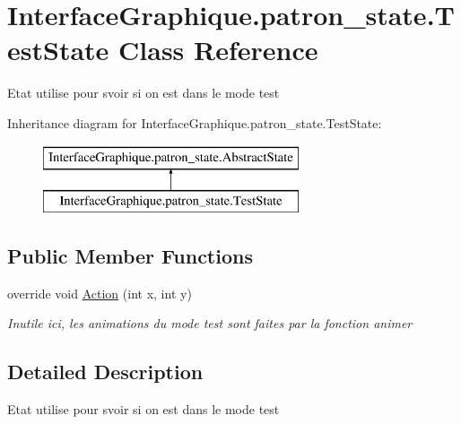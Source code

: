 \hypertarget{class_interface_graphique_1_1patron__state_1_1_test_state}{\section{Interface\-Graphique.\-patron\-\_\-state.\-Test\-State Class Reference}
\label{class_interface_graphique_1_1patron__state_1_1_test_state}
}


Etat utilise pour svoir si on est dans le mode test  


Inheritance diagram for Interface\-Graphique.\-patron\-\_\-state.\-Test\-State\-:\begin{figure}[H]
\begin{center}
\leavevmode
\includegraphics[height=2.000000cm]{class_interface_graphique_1_1patron__state_1_1_test_state}
\end{center}
\end{figure}
\subsection*{Public Member Functions}
\begin{DoxyCompactItemize}
\item 
override void \hyperlink{class_interface_graphique_1_1patron__state_1_1_test_state_ab7aa954cce22801d52158f3d70cbdcac}{Action} (int x, int y)
\begin{DoxyCompactList}\small\item\em Inutile ici, les animations du mode test sont faites par la fonction animer \end{DoxyCompactList}\end{DoxyCompactItemize}


\subsection{Detailed Description}
Etat utilise pour svoir si on est dans le mode test 



